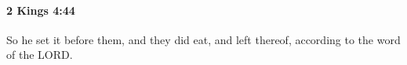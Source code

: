 
		\paragraph{2 Kings 4:44} %
			\label{2KINGS-4-44}

			So he set it before them, and they did eat, and left thereof, according to the word of the LORD.

